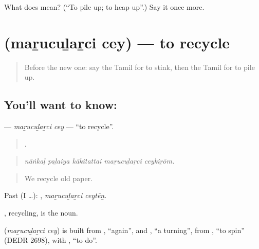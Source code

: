 \begin{tcolorbox}[breakable,colback=teal!4,colframe=teal!35!black,title={Before you move on}]
What does  mean? (\textquotedblleft{}To pile up; to heap up\textquotedblright{}.) Say it once more.
\end{tcolorbox}
\section[\texorpdfstring{\ta{மறுசுழற்சி} \ta{செய்} (maṟucuḻaṟci cey)}{மறுசுழற்சி செய் (maṟucuḻaṟci cey)}]{  (maṟucuḻaṟci cey) — to recycle}

\label{lesson:TA-C441-marucularci-cey}



\begin{quote}
Before the new one: say the Tamil for to stink, then the Tamil for to pile up.
\end{quote}

\subsection*{You'll want to know:  }
\textbf{ } — \emph{maṟucuḻaṟci cey} — \textquotedblleft{}to recycle\textquotedblright{}.

\begin{quote}
    .
\end{quote}

\begin{quote}
\emph{nāṅkaḷ paḻaiya kākitattai maṟucuḻaṟci ceykiṟōm.}
\end{quote}

\begin{quote}
We recycle old paper.
\end{quote}

Past (I …):  , \emph{maṟucuḻaṟci ceytēṉ}.

, recycling, is the noun.

\begin{cousinweb}
\textbf{ } (\emph{maṟucuḻaṟci cey}) is built from , \textquotedblleft{}again\textquotedblright{}, and , \textquotedblleft{}a turning\textquotedblright{}, from , \textquotedblleft{}to spin\textquotedblright{} (DEDR 2698), with , \textquotedblleft{}to do\textquotedblright{}.
\end{cousinweb}

